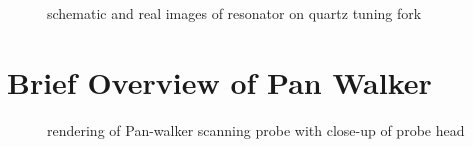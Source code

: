 \documentclass[11pt]{article}
\numberwithin{equation}{section}
\begin{document}
\begin{figure}%
    \centering
    \qquad
    \caption{schematic and real images of resonator on quartz tuning fork}%
    \label{fig:example}%
\end{figure}







\section{Brief Overview of Pan Walker}



\begin{figure}%
    \centering
    \qquad
    \caption{rendering of Pan-walker scanning probe with close-up of probe head}%
    \label{fig:example}%
\end{figure}
\end{document}
